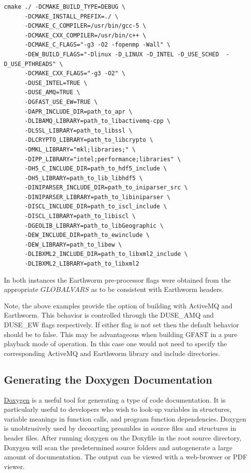 \documentclass[12pt]{article}
\begin{document}
\begin{verbatim}
cmake ./ -DCMAKE_BUILD_TYPE=DEBUG \
      -DCMAKE_INSTALL_PREFIX=./ \
      -DCMAKE_C_COMPILER=/usr/bin/gcc-5 \
      -DCMAKE_CXX_COMPILER=/usr/bin/c++ \
      -DCMAKE_C_FLAGS="-g3 -O2 -fopenmp -Wall" \
      -DEW_BUILD_FLAGS="-Dlinux -D_LINUX -D_INTEL -D_USE_SCHED  -D_USE_PTHREADS" \
      -DCMAKE_CXX_FLAGS="-g3 -O2" \
      -DUSE_INTEL=TRUE \
      -DUSE_AMQ=TRUE \
      -DGFAST_USE_EW=TRUE \      
      -DAPR_INCLUDE_DIR=path_to_apr \
      -DLIBAMQ_LIBRARY=path_to_libactivemq-cpp \
      -DLSSL_LIBRARY=path_to_libssl \
      -DLCRYPTO_LIBRARY=path_to_libcrypto \
      -DMKL_LIBRARY="mkl;libraries;" \
      -DIPP_LIBRARY="intel;performance;libraries" \
      -DH5_C_INCLUDE_DIR=path_to_hdf5_include \
      -DH5_LIBRARY=path_to_lib_libhdf5 \
      -DINIPARSER_INCLUDE_DIR=path_to_iniparser_src \
      -DINIPARSER_LIBRARY=path_to_libiniparser \
      -DISCL_INCLUDE_DIR=path_to_iscl_include \
      -DISCL_LIBRARY=path_to_libiscl \
      -DGEOLIB_LIBRARY=path_to_libGeographic \
      -DEW_INCLUDE_DIR=path_to_ewinclude \
      -DEW_LIBRARY=path_to_libew \
      -DLIBXML2_INCLUDE_DIR=path_to_libxml2_include \
      -DLIBXML2_LIBRARY=path_to_libxml2
\end{verbatim}
In both instances the Earthworm pre-processor flags were obtained from the appropriate
${GLOBALVARS}$ as to be consistent with Earthworm headers. 

Note, the above examples provide the option of building with ActiveMQ and Earthworm.  This
behavior is controlled through the DUSE\_AMQ and DUSE\_EW flags respectively.  If either flag
is not set then the default behavior should be to false.  This may be advantageous when
building GFAST in a pure playback mode of operation.  In this case one would not need to 
specify the corresponding ActiveMQ and Earthworm library and include directories.  

\subsection{Generating the Doxygen Documentation}
\href{http://www.stack.nl/~dimitri/doxygen/}{Doxygen}
is a useful tool for generating a type of code documentation.  It is particularly
useful to developers who wish to look-up variables in structures, variable meanings in 
function calls, and program function dependencies.  Doxygen is unobtrusively used by
decoarting preambles in source files and structures in header files.  After running
doxygen on the Doxyfile in the root source directory, Doxygen will scan the predetermined
source folders and autogenerate a large amount of documentation.  The output can be viewed
with a web-browser or PDF viewer.  
\end{document}
